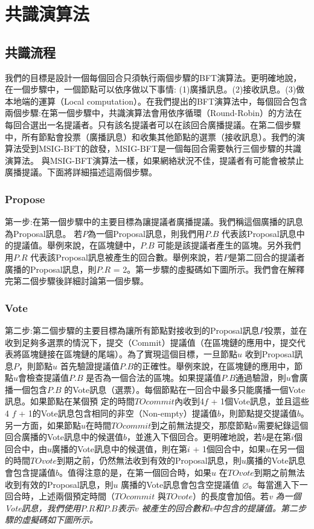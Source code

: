 \chapter{共識演算法}\label{se_3}

\section{共識流程}\label{se_3} 
我們的目標是設計一個每個回合只須執行兩個步驟的BFT演算法。更明確地說，在一個步驟中，一個節點可以依序做以下事情: (1)廣播訊息。(2)接收訊息。(3)做本地端的運算（Local computation）。在我們提出的BFT演算法中，每個回合包含兩個步驟:在第一個步驟中，共識演算法會用依序循環（Round-Robin）的方法在每回合選出一名提議者。只有該名提議者可以在該回合廣播提議。在第二個步驟中，所有節點會投票（廣播訊息）和收集其他節點的選票（接收訊息）。我們的演算法受到MSIG-BFT\cite{chen2018msig}的啟發，MSIG-BFT是一個每回合需要執行三個步驟的共識演算法。 與MSIG-BFT演算法一樣，如果網絡狀況不佳，提議者有可能會被禁止廣播提議。下面將詳細描述這兩個步驟。
%
\subsection{Propose}\label{se_3} 
第一步:在第一個步驟中的主要目標為讓提議者廣播提議。我們稱這個廣播的訊息為Proposal訊息。 若$P$為一個Proposal訊息，則我們用$P.B$ 代表該Proposal訊息中的提議值。舉例來說，在區塊鏈中，$P.B$ 可能是該提議者產生的區塊。另外我們用$P.R$ 代表該Proposal訊息被產生的回合數。舉例來說，若$P$是第二回合的提議者廣播的Proposal訊息，則$P.R$ = 2。第一步驟的虛擬碼如下圖所示。我們會在解釋完第二個步驟後詳細討論第一個步驟。


\subsection{Vote}\label{se_3} 
第二步:第二個步驟的主要目標為讓所有節點對接收到的Proposal訊息$P$投票，並在收到足夠多選票的情況下，提交（Commit）提議值（在區塊鏈的應用中，提交代表將區塊鏈接在區塊鏈的尾端）。為了實現這個目標，一旦節點$u$ 收到Proposal訊息$P$，則節點$u$ 首先驗證提議值$P.B$的正確性。舉例來說，在區塊鏈的應用中，節點$u$會檢查提議值$P.B$ 是否為一個合法的區塊。如果提議值$P.B$通過驗證，則$u$會廣播一個包含$P.B$ 的Vote訊息（選票）。每個節點在一回合中最多只能廣播一個Vote訊息。如果節點在某個預 定的時間$TOcommit$內收到4$f$ + 1個Vote訊息，並且這些4 $f$ + 1的Vote訊息包含相同的非空（Non-empty）提議值$b$，則節點提交提議值$b$。另一方面，如果節點$u$在時間$TOcommit$到之前無法提交，那麼節點$u$需要紀錄這個回合廣播的Vote訊息中的候選值$b$，並進入下個回合。更明確地說，若$b$是在第$i$個回合中，由$u$廣播的Vote訊息中的候選值，則在第$i$ + 1個回合中，如果$u$在另一個的時間$TOvote$到期之前，仍然無法收到有效的Proposal訊息，則$u$廣播的Vote訊息會包含提議值$b$。值得注意的是，在第一個回合時，如果$u$ 在$TOvote$到期之前無法收到有效的Proposal訊息，則$u$ 廣播的Vote訊息會包含空提議值 $\varnothing$。每當進入下一回合時，上述兩個預定時間（$TOcommit$ 與$TOvote$）的長度會加倍。若\em v 為一個Vote訊息，我們使用$P.R$和$P.B$表示$v$ 被產生的回合數和\em v中包含的提議值。第二步驟的虛擬碼如下圖所示。


